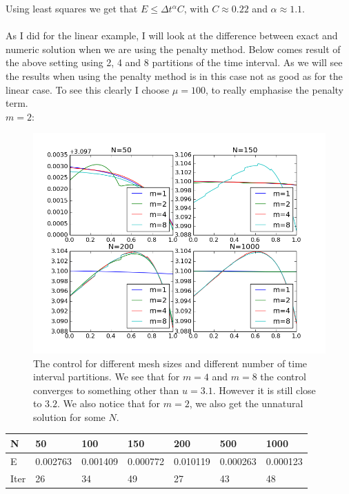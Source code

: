\documentclass[11pt,a4paper]{article}
\begin{document}
Using least squares we get that $E\leq \Delta t^{\alpha}C$, with $C\approx 0.22$ and $\alpha\approx1.1$. 
\\
\\
As I did for the linear example, I will look at the difference between exact and numeric solution when we are using the penalty method. Below comes result of the above setting using 2, 4 and 8 partitions of the time interval. As we will see the results when using the penalty method is in this case not as good as for the linear case. To see this clearly I choose $\mu =100$, to really emphasise the penalty term.
\\
$m=2$:
\begin{figure}
  \includegraphics[width=\linewidth]{quad_manu_control.png}
  \caption{The control for different mesh sizes and different number of time interval partitions. We see that for $m=4$ and $m=8$ the control converges to something other than $u=3.1$. However it is still close to $3.2$. We also notice that for $m=2$, we also   get the unnatural solution for some $N$. }
  \label{Fig 4}
\end{figure}
\begin{center}
    \begin{tabular}{| l | l | l | l | l | l | l |}
    \hline
    N & 50 & 100  & 150 & 200 & 500 & 1000 \\ \hline
    E & 0.002763 & 0.001409 &0.000772 & 0.010119 & 0.000263 & 0.000123	\\ \hline
    Iter & 26 & 34  & 49 & 27 & 43 & 48 \\ \hline
    \end{tabular}
\end{center}
\end{document}
